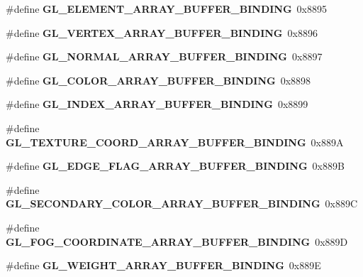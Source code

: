 \begin{DoxyCompactItemize}
\item 
\#define {\bfseries G\+L\+\_\+\+E\+L\+E\+M\+E\+N\+T\+\_\+\+A\+R\+R\+A\+Y\+\_\+\+B\+U\+F\+F\+E\+R\+\_\+\+B\+I\+N\+D\+I\+N\+G}~0x8895\label{_s_d_l__opengl_8h_a2af45d6380eba1087a8e5bc684d6ab72}

\item 
\#define {\bfseries G\+L\+\_\+\+V\+E\+R\+T\+E\+X\+\_\+\+A\+R\+R\+A\+Y\+\_\+\+B\+U\+F\+F\+E\+R\+\_\+\+B\+I\+N\+D\+I\+N\+G}~0x8896\label{_s_d_l__opengl_8h_a79550920c9e83ff8535c6bf8e51b2ebb}

\item 
\#define {\bfseries G\+L\+\_\+\+N\+O\+R\+M\+A\+L\+\_\+\+A\+R\+R\+A\+Y\+\_\+\+B\+U\+F\+F\+E\+R\+\_\+\+B\+I\+N\+D\+I\+N\+G}~0x8897\label{_s_d_l__opengl_8h_ab38c3ddb781a053aa5b5f7451f4c93af}

\item 
\#define {\bfseries G\+L\+\_\+\+C\+O\+L\+O\+R\+\_\+\+A\+R\+R\+A\+Y\+\_\+\+B\+U\+F\+F\+E\+R\+\_\+\+B\+I\+N\+D\+I\+N\+G}~0x8898\label{_s_d_l__opengl_8h_aa0c030b98068db9ec0a0e49d0a0ef324}

\item 
\#define {\bfseries G\+L\+\_\+\+I\+N\+D\+E\+X\+\_\+\+A\+R\+R\+A\+Y\+\_\+\+B\+U\+F\+F\+E\+R\+\_\+\+B\+I\+N\+D\+I\+N\+G}~0x8899\label{_s_d_l__opengl_8h_a25b4469ee770b86f9cfb5a33d925bbb5}

\item 
\#define {\bfseries G\+L\+\_\+\+T\+E\+X\+T\+U\+R\+E\+\_\+\+C\+O\+O\+R\+D\+\_\+\+A\+R\+R\+A\+Y\+\_\+\+B\+U\+F\+F\+E\+R\+\_\+\+B\+I\+N\+D\+I\+N\+G}~0x889\+A\label{_s_d_l__opengl_8h_a431fc201ab69cc23b9e4040333c328c6}

\item 
\#define {\bfseries G\+L\+\_\+\+E\+D\+G\+E\+\_\+\+F\+L\+A\+G\+\_\+\+A\+R\+R\+A\+Y\+\_\+\+B\+U\+F\+F\+E\+R\+\_\+\+B\+I\+N\+D\+I\+N\+G}~0x889\+B\label{_s_d_l__opengl_8h_a609cd6a89260d808c01a1f94bfb1193f}

\item 
\#define {\bfseries G\+L\+\_\+\+S\+E\+C\+O\+N\+D\+A\+R\+Y\+\_\+\+C\+O\+L\+O\+R\+\_\+\+A\+R\+R\+A\+Y\+\_\+\+B\+U\+F\+F\+E\+R\+\_\+\+B\+I\+N\+D\+I\+N\+G}~0x889\+C\label{_s_d_l__opengl_8h_aa369d6ae05d52b3c105180927dda1680}

\item 
\#define {\bfseries G\+L\+\_\+\+F\+O\+G\+\_\+\+C\+O\+O\+R\+D\+I\+N\+A\+T\+E\+\_\+\+A\+R\+R\+A\+Y\+\_\+\+B\+U\+F\+F\+E\+R\+\_\+\+B\+I\+N\+D\+I\+N\+G}~0x889\+D\label{_s_d_l__opengl_8h_a050ffbb90bb6f9feb4823200094703d8}

\item 
\#define {\bfseries G\+L\+\_\+\+W\+E\+I\+G\+H\+T\+\_\+\+A\+R\+R\+A\+Y\+\_\+\+B\+U\+F\+F\+E\+R\+\_\+\+B\+I\+N\+D\+I\+N\+G}~0x889\+E\label{_s_d_l__opengl_8h_ac601d7cb29a4d3d35e2e7654beab6e50}


\end{DoxyCompactItemize}
